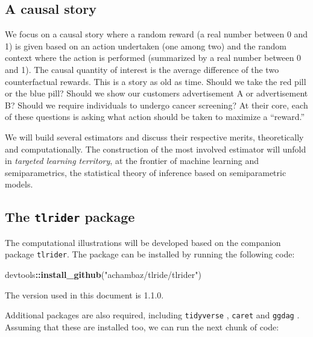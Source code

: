\documentclass[11pt,openright,twoside]{book}
\newenvironment{Shaded}{\begin{snugshade}}{\end{snugshade}}
\newcommand{\KeywordTok}[1]{\textcolor[rgb]{0.13,0.29,0.53}{\textbf{#1}}}
\newcommand{\NormalTok}[1]{#1}
\newcommand{\OperatorTok}[1]{\textcolor[rgb]{0.81,0.36,0.00}{\textbf{#1}}}
\newcommand{\StringTok}[1]{\textcolor[rgb]{0.31,0.60,0.02}{#1}}
\theoremstyle{definition}
\theoremstyle{definition}
\theoremstyle{definition}
\theoremstyle{remark}
\begin{document}
\hypertarget{causal-story}{%
\subsection{A causal story}\label{causal-story}}

We focus on a causal story where a random reward (a real number between 0 and
1) is given based on an action undertaken (one among two) and the random
context where the action is performed (summarized by a real number between 0
and 1). The causal quantity of interest is the average difference of the two
counterfactual rewards. This is a story as old as time. Should we take the red
pill or the blue pill? Should we show our customers advertisement A or
advertisement B? Should we require individuals to undergo cancer screening? At
their core, each of these questions is asking what action should be taken to
maximize a ``reward.''

We will build several estimators and discuss their respective merits,
theoretically and computationally. The construction of the most involved
estimator will unfold in \emph{targeted learning territory}, at the frontier of
machine learning and semiparametrics, the statistical theory of inference
based on semiparametric models.

\hypertarget{tlrider-package}{%
\subsection{\texorpdfstring{The \texttt{tlrider} package}{The tlrider package}}\label{tlrider-package}}

The computational illustrations will be developed based on the companion
package \texttt{tlrider}. The package can be installed by
running the following code:

\begin{Shaded}
\begin{Highlighting}[]
\NormalTok{devtools}\OperatorTok{::}\KeywordTok{install_github}\NormalTok{(}\StringTok{"achambaz/tlride/tlrider"}\NormalTok{)}
\end{Highlighting}
\end{Shaded}

The version used in this document is 1.1.0.

Additional packages are also required, including \texttt{tidyverse} \citep{r4ds}, \texttt{caret}
\citep{caret} and \texttt{ggdag} \citep{ggdag}. Assuming that these are installed too, we can
run the next chunk of code:
\end{document}
